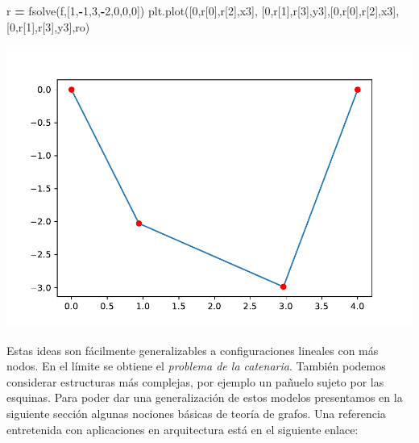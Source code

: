 \documentclass[
]{book}
\newenvironment{Shaded}{\begin{snugshade}}{\end{snugshade}}
\newcommand{\DecValTok}[1]{\textcolor[rgb]{0.00,0.00,0.81}{#1}}
\newcommand{\NormalTok}[1]{#1}
\newcommand{\OperatorTok}[1]{\textcolor[rgb]{0.81,0.36,0.00}{\textbf{#1}}}
\newcommand{\StringTok}[1]{\textcolor[rgb]{0.31,0.60,0.02}{#1}}
\theoremstyle{definition}
\theoremstyle{definition}
\theoremstyle{definition}
\theoremstyle{definition}
\theoremstyle{remark}
\begin{document}
\begin{Shaded}
\begin{Highlighting}[]
\NormalTok{r }\OperatorTok{=}\NormalTok{ fsolve(f,[}\DecValTok{1}\NormalTok{,}\OperatorTok{{-}}\DecValTok{1}\NormalTok{,}\DecValTok{3}\NormalTok{,}\OperatorTok{{-}}\DecValTok{2}\NormalTok{,}\DecValTok{0}\NormalTok{,}\DecValTok{0}\NormalTok{,}\DecValTok{0}\NormalTok{])}
\NormalTok{plt.plot([}\DecValTok{0}\NormalTok{,r[}\DecValTok{0}\NormalTok{],r[}\DecValTok{2}\NormalTok{],x3], [}\DecValTok{0}\NormalTok{,r[}\DecValTok{1}\NormalTok{],r[}\DecValTok{3}\NormalTok{],y3],[}\DecValTok{0}\NormalTok{,r[}\DecValTok{0}\NormalTok{],r[}\DecValTok{2}\NormalTok{],x3], [}\DecValTok{0}\NormalTok{,r[}\DecValTok{1}\NormalTok{],r[}\DecValTok{3}\NormalTok{],y3],}\StringTok{\textquotesingle{}ro\textquotesingle{}}\NormalTok{)}
\end{Highlighting}
\end{Shaded}

\includegraphics{_main_files/figure-latex/unnamed-chunk-2-1.pdf}

Estas ideas son fácilmente generalizables a configuraciones lineales con más nodos. En el límite se obtiene el \emph{problema de la catenaria}. También podemos considerar estructuras más complejas, por ejemplo un pañuelo sujeto por las esquinas. Para poder dar una generalización de estos modelos presentamos en la siguiente sección algunas nociones básicas de teoría de grafos. Una referencia entretenida con aplicaciones en arquitectura está en el siguiente enlace:
\end{document}
